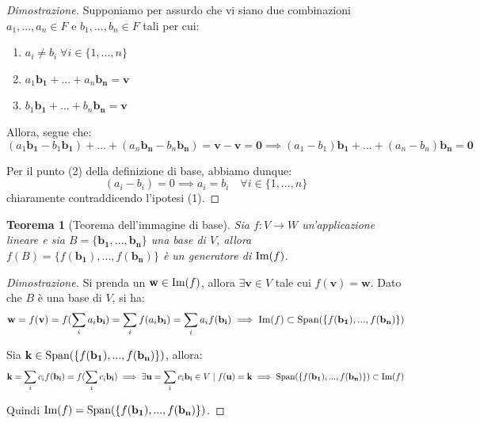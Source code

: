 \documentclass{article}
\newtheorem{theorem}{Teorema}
\begin{document}
    \begin{proof}[Dimostrazione]
        Supponiamo per assurdo che vi siano due combinazioni $a_1,...,a_n \in F$ e $b_1,...,b_n \in F$ tali per cui: 
        \begin{enumerate}[label=(\arabic*)]
            \item $a_i \neq b_i \; \forall i \in \{1,...,n\}$
            \item $a_1\mathbf{b_1} + ... + a_n\mathbf{b_n} = \mathbf{v}$ 
            \item $b_1\mathbf{b_1} + ... + b_n\mathbf{b_n} = \mathbf{v}$ 
        \end{enumerate} 

        Allora, segue che:
        \[
            (a_1\mathbf{b_1} - b_1\mathbf{b_1}) + ... + (a_n\mathbf{b_n} - b_n\mathbf{b_n}) = \mathbf{v} - \mathbf{v} = \mathbf{0} \implies (a_1 - b_1) \mathbf{b_1} + ... + (a_n - b_n) \mathbf{b_n} = \mathbf{0} 
        \]

        Per il punto (2) della definizione di base, abbiamo dunque:
        \[
            (a_i - b_i) = 0 \implies a_i = b_i \quad \forall i \in \{1,...,n\}
        \]
        chiaramente contraddicendo l'ipotesi (1).
    \end{proof}

    \begin{theorem}[Teorema dell'immagine di base]
        Sia $f : V \rightarrow W$ un'applicazione lineare e sia $B = \{\mathbf{b_1}, ..., \mathbf{b_n}\}$ una base di $V$, allora $f(B) = \{f(\mathbf{b_1}), ..., f(\mathbf{b_n})\}$ è un generatore di $\textnormal{Im}(f)$.
    \end{theorem}

    \begin{proof}[Dimostrazione]
        Si prenda un $\mathbf{w} \in \textnormal{Im}(f)$, allora $\exists \mathbf{v} \in V$ tale cui $f(\mathbf{v}) = \mathbf{w}$. Dato che $B$ è una base di $V$, si ha:
        \[
            \mathbf{w} = f(\mathbf{v}) = f(\sum_{i} a_i \mathbf{b_i}) = \sum_{i} f(a_i \mathbf{b_i}) = \sum_{i} a_i f(\mathbf{b_i}) \implies \textnormal{Im}(f) \subset \textnormal{Span}(\{f(\mathbf{b_1}), ..., f(\mathbf{b_n})\})
        \]

        Sia $\mathbf{k} \in \textnormal{Span}(\{f(\mathbf{b_1}), ..., f(\mathbf{b_n})\})$, allora:
        \[
            \mathbf{k} = \sum_{i} c_i f(\mathbf{b_i}) = f(\sum_{i} c_i \mathbf{b_i}) \implies \exists \mathbf{u} = \sum_{i} c_i \mathbf{b_i} \in V \; | \; f(\mathbf{u}) = \mathbf{k} \implies \textnormal{Span}(\{f(\mathbf{b_1}), ..., f(\mathbf{b_n})\}) \subset \textnormal{Im}(f)
        \]

        Quindi $\textnormal{Im}(f) = \textnormal{Span}(\{f(\mathbf{b_1}), ..., f(\mathbf{b_n})\})$. 
    \end{proof}
\end{document}
